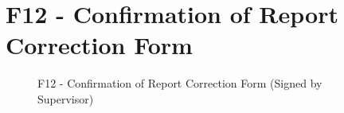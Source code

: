 \chapter{F12 - Confirmation of Report Correction Form}
\begin{figure}[h]
    \centering
    \setlength{\fboxsep}{0pt}
    \caption{F12 - Confirmation of Report Correction Form (Signed by Supervisor)}
    \label{fig:myfig100}
\end{figure}
\clearpage
